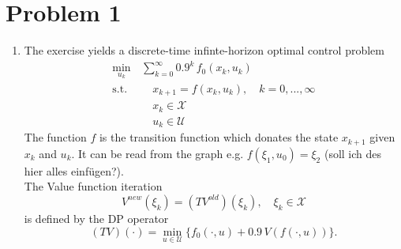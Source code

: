 \documentclass[12pt,pdftex,a4paper]{scrartcl}
\begin{document}
\section*{Problem 1}
\begin{enumerate}

	\item The exercise yields a discrete-time infinte-horizon optimal control problem
	\begin{equation*}
		\begin{split}
			\min_{u_k} \,& \sum_{k=0}^\infty 0.9^k\,f_0(x_k,u_k) \\
			\text{s.t.} & \quad x_{k+1} = f(x_k,u_k), \quad k=0,...,\infty \\
			& \quad x_k \in \mathcal{X} \\
			& \quad u_k \in \mathcal{U}
		\end{split}
	\end{equation*}
	The function $f$ is the transition function which donates the state $x_{k+1}$ given $x_k$ and $u_k$. It can be read from the graph e.g. $f(\xi_1, u_0) = \xi_2$ (soll ich des hier alles einfügen?).\\
	The Value function iteration
	\begin{equation*}
		V^{new}(\xi_k) = (TV^{old})(\xi_k), \quad \xi_k \in \mathcal{X}
	\end{equation*}
	is defined by the DP operator
	\begin{equation*}
		(TV)(\cdot ) = \min_{u\in\mathcal{U}}\{ f_0(\cdot , u) + 0.9\,V(f(\cdot , u))\}.
	\end{equation*}
	

\end{enumerate}
\end{document}
